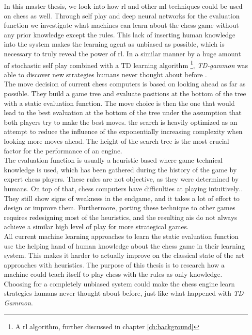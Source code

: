 In this master thesis, we look into how \acrlong{rl} and other \acrlong{ml} techniques could be used on chess as well. Through self play and deep neural networks for the evaluation function we investigate what machines can learn about the chess game without any prior knowledge except the rules. This lack of inserting human knowledge into the system makes the learning agent as unbiased as possible, which is necessary to truly reveal the power of \gls{rl}. In a similar manner by a huge amount of stochastic self play combined with a TD learning algorithm \footnote{A \gls{rl} algorithm, further discussed in chapter \ref{ch:background}}, \textit{TD-gammon} was able to discover new strategies humans never thought about before \cite{tdgammon95}.\\

The move decision of current chess computers is based on looking ahead as far as possible. They build a game tree and evaluate positions at the bottom of the tree with a static evaluation function. The move choice is then the one that would lead to the best evaluation at the bottom of the tree under the assumption that both players try to make the best moves. the search is heavily optimized as an attempt to reduce the influence of the exponentially increasing complexity when looking more moves ahead. The height of the search tree is the most crucial factor for the performance of an engine.\\

The evaluation function is usually a heuristic based where game technical knowledge is used, which has been gathered during the history of the game by expert chess players. These rules are not objective, as they were determined by humans. On top of that, chess computers have difficulties at playing intuitively.. They still show signs of weakness in the endgame, and it takes a lot of effort to design or improve them. Furthermore, porting these technique to other games requires redesigning most of the heuristics, and the resulting \glspl{ai} do not always achieve a similar high level of play for more strategical games.\\

All current machine learning approaches to learn the static evaluation function use the helping hand of human knowledge about the chess game in their learning system. This makes it harder to actually improve on the classical state of the art approaches with heuristics. The purpose of this thesis is to research how a machine could teach itself to play chess with the rules as only knowledge. Choosing for a completely unbiased system could make the chess engine learn strategies humans never thought about before, just like what happened with \textit{TD-Gammon}. \\

